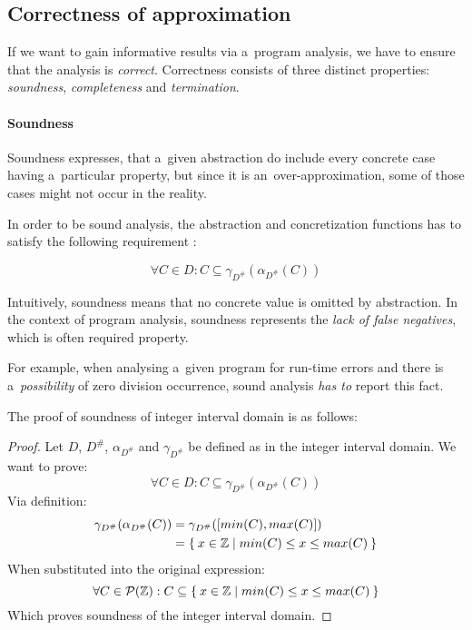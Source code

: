 \documentclass[12pt,oneside]{fithesis2}
\theoremstyle{definition}
\begin{document}
\subsection{Correctness of approximation}\label{ssec:soundness-incompleteness}

If we want to gain informative results via a~program analysis, we have to ensure that the analysis is \textit{correct}. Correctness consists of three distinct properties: \textit{soundness}, \textit{completeness} and \textit{termination}.

\paragraph{Soundness}
Soundness expresses, that a~given abstraction do include every concrete case having a~particular property, but since it is an~over-approximation, some of those cases might not occur in the reality.

In order to be sound analysis, the abstraction and concretization functions has to satisfy the following requirement \cite{mine-AIAA10}:

\[
  \forall C \in D: C \subseteq \gamma_{D^\#}(\alpha_{D^\#}(C))
\]

Intuitively, soundness means that no concrete value is omitted by abstraction. In the context of program analysis, soundness represents the \textit{lack of false negatives}, which is often required property.

For example, when analysing a~given program for run-time errors and there is a~\textit{possibility} of zero division occurrence, sound analysis \textit{has to} report this fact.

The proof of soundness of integer interval domain is as follows:

\begin{proof}
  Let $D$, $D^\#$, $\alpha_{D^\#}$ and $\gamma_{D^\#}$ be defined as in the integer interval domain. We want to prove:
  \[
    \forall C \in D: C \subseteq \gamma_{D^\#}(\alpha_{D^\#}(C))
  \]
  Via definition:
  \begin{align*}
    \gamma_{D^\#}(\alpha_{D^\#}(C)) &= \gamma_{D^\#}([min(C), max(C)])\\
    &= \Set{ x \in \mathbb Z | min(C) \le x \le max(C) }
  \end{align*}
  When substituted into the original expression:
  \[
    \forall C \in \mathcal P(\mathbb Z): C \subseteq \Set{ x \in \mathbb Z | min(C) \le x \le max(C) }
  \]
  Which proves soundness of the integer interval domain.
\end{proof}
\end{document}

